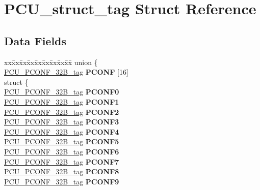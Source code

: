 \hypertarget{structPCU__struct__tag}{}\section{P\+C\+U\+\_\+struct\+\_\+tag Struct Reference}
\label{structPCU__struct__tag}
\subsection*{Data Fields}
\begin{DoxyCompactItemize}
\item 
\mbox{\label{structPCU__struct__tag_a9c03e4685850f9e0ec5b0757347dff3a}} 
\begin{tabbing}
xx\=xx\=xx\=xx\=xx\=xx\=xx\=xx\=xx\=\kill
union \{\\
\>\mbox{\hyperlink{unionPCU__PCONF__32B__tag}{PCU\_PCONF\_32B\_tag}} {\bfseries PCONF} \mbox{[}16\mbox{]}\\
\mbox{\label{unionPCU__struct__tag_1_1_0D1721_a510dbb8e47853dc59098b010b34f4ffc}} 
\>struct \{\\
\>\>\mbox{\hyperlink{unionPCU__PCONF__32B__tag}{PCU\_PCONF\_32B\_tag}} {\bfseries PCONF0}\\
\>\>\mbox{\hyperlink{unionPCU__PCONF__32B__tag}{PCU\_PCONF\_32B\_tag}} {\bfseries PCONF1}\\
\>\>\mbox{\hyperlink{unionPCU__PCONF__32B__tag}{PCU\_PCONF\_32B\_tag}} {\bfseries PCONF2}\\
\>\>\mbox{\hyperlink{unionPCU__PCONF__32B__tag}{PCU\_PCONF\_32B\_tag}} {\bfseries PCONF3}\\
\>\>\mbox{\hyperlink{unionPCU__PCONF__32B__tag}{PCU\_PCONF\_32B\_tag}} {\bfseries PCONF4}\\
\>\>\mbox{\hyperlink{unionPCU__PCONF__32B__tag}{PCU\_PCONF\_32B\_tag}} {\bfseries PCONF5}\\
\>\>\mbox{\hyperlink{unionPCU__PCONF__32B__tag}{PCU\_PCONF\_32B\_tag}} {\bfseries PCONF6}\\
\>\>\mbox{\hyperlink{unionPCU__PCONF__32B__tag}{PCU\_PCONF\_32B\_tag}} {\bfseries PCONF7}\\
\>\>\mbox{\hyperlink{unionPCU__PCONF__32B__tag}{PCU\_PCONF\_32B\_tag}} {\bfseries PCONF8}\\
\>\>\mbox{\hyperlink{unionPCU__PCONF__32B__tag}{PCU\_PCONF\_32B\_tag}} {\bfseries PCONF9}\\

\end{tabbing}
\end{DoxyCompactItemize}
